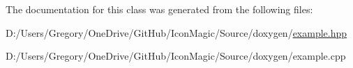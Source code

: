 The documentation for this class was generated from the following files\+:\begin{DoxyCompactItemize}
\item 
D\+:/\+Users/\+Gregory/\+One\+Drive/\+Git\+Hub/\+Icon\+Magic/\+Source/doxygen/\hyperlink{example_8hpp}{example.\+hpp}\item 
D\+:/\+Users/\+Gregory/\+One\+Drive/\+Git\+Hub/\+Icon\+Magic/\+Source/doxygen/example.\+cpp\end{DoxyCompactItemize}
